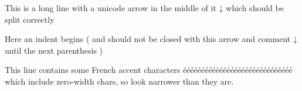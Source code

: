 \documentclass{article}
\begin{document}
This is a long line with a unicode arrow in the
middle of it ↓ which should be split correctly

Here an indent begins (
  and should not be closed with this arrow and comment ↓%
  until the next parenthesis
)

This line contains some French accent characters éééééééééééééééééééééééééééééé
which include zero-width chars, so look narrower than they are.
\end{document}
